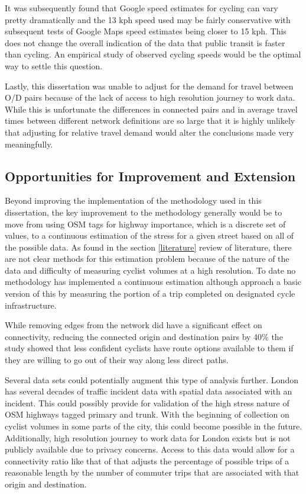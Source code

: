 It was subsequently found that Google speed estimates for cycling can vary pretty dramatically and the 13 kph speed used may be fairly conservative with subsequent tests of Google Maps speed estimates being closer to 15 kph. This does not change the overall indication of the data that public transit is faster than cycling. An empirical study of observed cycling speeds would be the optimal way to settle this question. 

Lastly, this dissertation was unable to adjust for the demand for travel between O/D pairs because of the lack of access to high resolution journey to work data. While this is unfortunate the differences in connected pairs and in average travel times between different network definitions are so large that it is highly unlikely that adjusting for relative travel demand would alter the conclusions made very meaningfully. 

\subsection{Opportunities for Improvement and Extension}

Beyond improving the implementation of the methodology used in this dissertation, the key improvement to the methodology generally would be to move from using OSM tags for highway importance, which is a discrete set of values, to a continuous estimation of the stress for a given street based on all of the possible data. As found in the section \ref{literature} review of literature, there are not clear methods for this estimation problem because of the nature of the data and difficulty of measuring cyclist volumes at a high resolution. To date no methodology has implemented a continuous estimation although \textcite{boisjoly2019bicycle} approach a basic version of this by measuring the portion of a trip completed on designated cycle infrastructure. 

While removing edges from the network did have a significant effect on connectivity, reducing the connected origin and destination pairs by 40\% the study showed that less confident cyclists have route options available to them if they are willing to go out of their way along less direct paths.

Several data sets could potentially augment this type of analysis further. London has several decades of traffic incident data with spatial data associated with an incident. This could possibly provide for validation of the high stress nature of OSM highways tagged primary and trunk. With the beginning of collection on cyclist volumes in some parts of the city, this could become possible in the future.  Additionally, high resolution journey to work data for London exists but is not publicly available due to privacy concerns. Access to this data would allow for a connectivity ratio like that of \textcite{furth2016network} that adjusts the percentage of possible trips of a reasonable length by the number of commuter trips that are associated with that origin and destination. 

